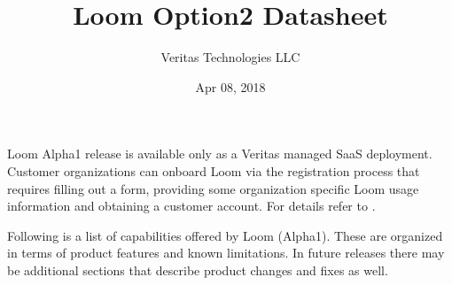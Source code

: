 \documentclass[letterpaper,10pt,english]{sphinxhowto}
\title{Loom Option2 Datasheet}
\date{Apr 08, 2018}
\author{Veritas Technologies LLC}
\begin{document}
\maketitle
\sphinxtableofcontents
{}\label{\detokenize{relnotes/rn-loom-alpha1::doc}}


Loom Alpha1 release is available only as a Veritas managed SaaS deployment.  Customer organizations can onboard Loom via the registration process that requires filling out a form, providing some organization specific Loom usage information and obtaining a customer account. For details refer to .

Following is a list of capabilities offered by Loom (Alpha1). These are organized in terms of product features and known limitations. In future releases there may be additional sections that describe product changes and fixes as well.
\label{\detokenize{relnotes/rn-loom-alpha1:content-rn-loom-common}}
\end{document}
